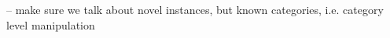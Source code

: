 \documentclass{article}
\begin{document}
-- make sure we talk about novel instances, but known categories, i.e. category level manipulation



\end{document}
